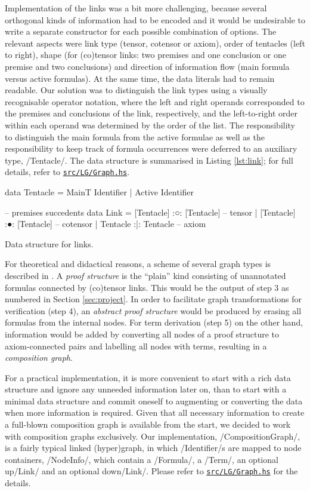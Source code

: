 \documentclass[12pt,a4paper]{article}
\newcommand{\coderef}[1]{\href{https://github.com/jgonggrijp/net-prove/blob/report/#1}{\texttt{#1}}}
\begin{document}
Implementation of the links was a bit more challenging, because several orthogonal kinds of information had to be encoded and it would be undesirable to write a separate constructor for each possible combination of options. The relevant aspects were link type (tensor, cotensor or axiom), order of tentacles (left to right), shape (for (co)tensor links: two premises and one conclusion or one premise and two conclusions) and direction of information flow (main formula versus active formulas). At the same time, the data literals had to remain readable. Our solution was to distinguish the link types using a visually recognisable operator notation, where the left and right operands corresponded to the premises and conclusions of the link, respectively, and the left-to-right order within each operand was determined by the order of the list. The responsibility to distinguish the main formula from the active formulae as well as the responsibility to keep track of formula occurrences were deferred to an auxiliary type, \hs/Tentacle/. The data structure is summarised in Listing \ref{lst:link}; for full details, refer to \coderef{src/LG/Graph.hs}.

\begin{listing}
    \begin{haskellcode}
        data Tentacle = MainT Identifier | Active Identifier
        
        --           premises      succedents
        data Link = [Tentacle] :○: [Tentacle]  -- tensor
                  | [Tentacle] :●: [Tentacle]  -- cotensor
                  |  Tentacle  :|:  Tentacle   -- axiom
    \end{haskellcode}
    \caption{Data structure for links.}
    \label{lst:link}
\end{listing}

For theoretical and didactical reasons, a scheme of several graph types is described in \cite{mm12}. A \emph{proof structure} is the ``plain'' kind consisting of unannotated formulas connected by (co)tensor links. This would be the output of step 3 as numbered in Section \ref{sec:project}. In order to facilitate graph transformations for verification (step 4), an \emph{abstract proof structure} would be produced by erasing all formulas from the internal nodes. For term derivation (step 5) on the other hand, information would be added by converting all nodes of a proof structure to axiom-connected pairs and labelling all nodes with terms, resulting in a \emph{composition graph}.

For a practical implementation, it is more convenient to start with a rich data structure and ignore any unneeded information later on, than to start with a minimal data structure and commit oneself to augmenting or converting the data when more information is required. Given that all necessary information to create a full-blown composition graph is available from the start, we decided to work with composition graphs exclusively. Our implementation, \hs/CompositionGraph/, is a fairly typical linked (hyper)graph, in which \hs/Identifier/s are mapped to node containers, \hs/NodeInfo/, which contain a \hs/Formula/, a \hs/Term/, an optional up\hs/Link/ and an optional down\hs/Link/. Please refer to \coderef{src/LG/Graph.hs} for the details.
\end{document}
